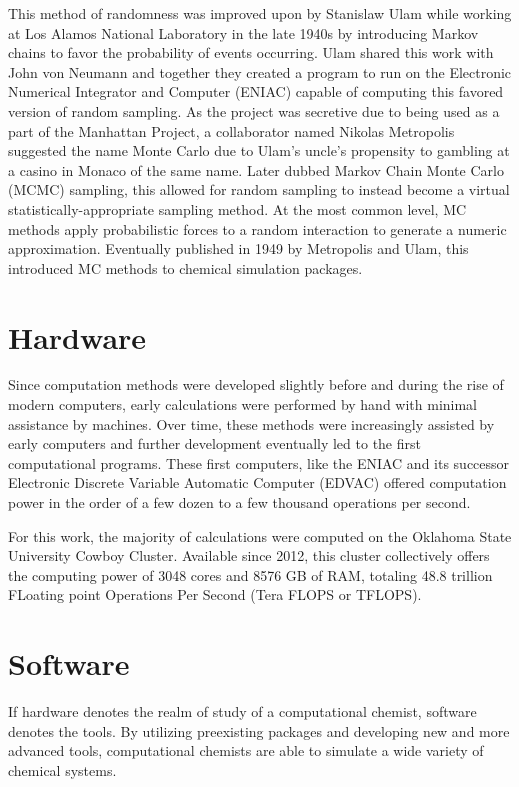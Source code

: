 This method of randomness was improved upon by Stanislaw Ulam while working at Los Alamos National Laboratory in the late 1940s by introducing Markov chains to favor the probability of events occurring.
Ulam shared this work with John von Neumann and together they created a program to run on the Electronic Numerical Integrator and Computer (ENIAC) capable of computing this favored version of random sampling.
As the project was secretive due to being used as a part of the Manhattan Project, a collaborator named Nikolas Metropolis suggested the name Monte Carlo due to Ulam's uncle's propensity to gambling at a casino in Monaco of the same name.\cite{MCOrigins}
Later dubbed Markov Chain Monte Carlo (MCMC) sampling, this allowed for random sampling to instead become a virtual statistically-appropriate sampling method.
At the most common level, MC methods apply probabilistic forces to a random interaction to generate a numeric approximation.
Eventually published in 1949 by Metropolis and Ulam, this introduced MC methods to chemical simulation packages.\cite{MCMetropolis}



\section{Hardware}

Since computation methods were developed slightly before and during the rise of modern computers, early calculations were performed by hand with minimal assistance by machines. 
Over time, these methods were increasingly assisted by early computers and further development eventually led to the first computational programs.
These first computers, like the ENIAC and its successor Electronic Discrete Variable Automatic Computer (EDVAC) offered computation power in the order of a few dozen to a few thousand operations per second.

For this work, the majority of calculations were computed on the Oklahoma State University Cowboy Cluster. 
Available since 2012, this cluster collectively offers the computing power of 3048 cores and 8576 GB of RAM, totaling 48.8 trillion FLoating point Operations Per Second (Tera FLOPS or TFLOPS). 

\section{Software}

If hardware denotes the realm of study of a computational chemist, software denotes the tools. 
By utilizing preexisting packages and developing new and more advanced tools, computational chemists are able to simulate a wide variety of chemical systems.

